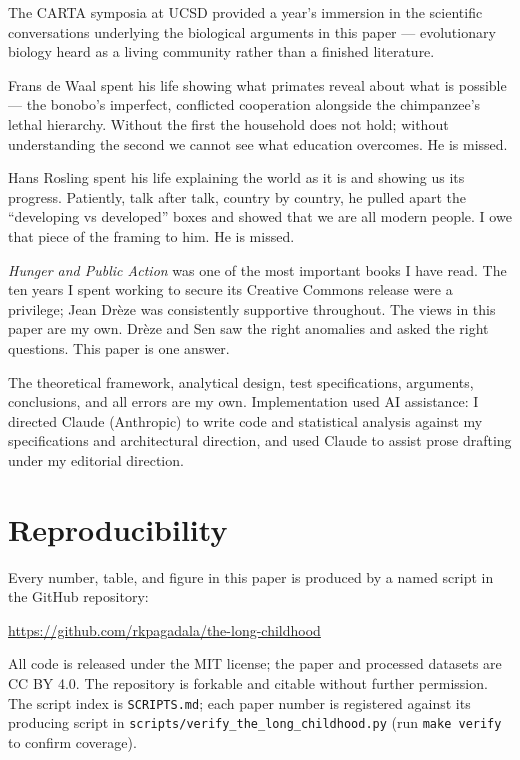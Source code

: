 \documentclass[12pt,letterpaper]{article}
\begin{document}
The CARTA symposia at UCSD provided a year's immersion in the
scientific conversations underlying the biological arguments in this
paper --- evolutionary biology heard as a living community rather than
a finished literature.

Frans de Waal spent his life showing what primates reveal about what
is possible --- the bonobo's imperfect, conflicted cooperation
alongside the chimpanzee's lethal hierarchy. Without the first the
household does not hold; without understanding the second we cannot
see what education overcomes. He is missed.

Hans Rosling spent his life explaining the world as it is and
showing us its progress. Patiently, talk after talk, country by
country, he pulled apart the ``developing vs developed'' boxes and
showed that we are all modern people. I owe that piece of the framing
to him. He is missed.

\emph{Hunger and Public Action} was one of the most important books I
have read. The ten years I spent working to secure its Creative
Commons release were a privilege; Jean Drèze was consistently
supportive throughout. The views in this paper are my own. Drèze and
Sen saw the right anomalies and asked the right questions. This paper
is one answer.

The theoretical framework, analytical design, test specifications,
arguments, conclusions, and all errors are my own. Implementation
used AI assistance: I directed Claude (Anthropic) to write code and
statistical analysis against my specifications and architectural
direction, and used Claude to assist prose drafting under my
editorial direction.


\appendix

\section{Reproducibility}\label{appendix-reproducibility}

Every number, table, and figure in this paper is produced by a named
script in the GitHub repository:

\begin{center}
\url{https://github.com/rkpagadala/the-long-childhood}
\end{center}

\noindent All code is released under the MIT license; the paper and
processed datasets are CC BY 4.0. The repository is forkable and
citable without further permission. The script index is
\texttt{SCRIPTS.md}; each paper number is registered against its
producing script in
\texttt{scripts/verify\_the\_long\_childhood.py} (run
\texttt{make verify} to confirm coverage).
\end{document}
